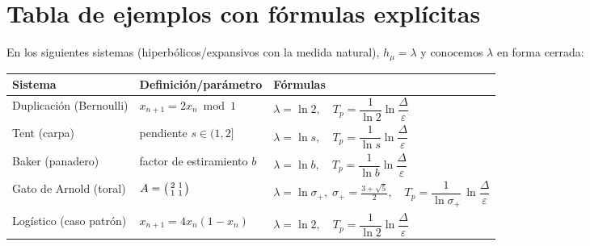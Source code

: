 \documentclass[11pt,a4paper]{article}
\begin{document}
\section*{Tabla de ejemplos con fórmulas explícitas}
En los siguientes sistemas (hiperbólicos/expansivos con la medida natural), $h_\mu=\lambda$ y
conocemos $\lambda$ en forma cerrada:
\begin{center}
\begin{tabular}{@{} l l l @{}}
\toprule
\textbf{Sistema} & \textbf{Definición/parámetro} & \textbf{Fórmulas}\\
\midrule
Duplicación (Bernoulli) & $x_{n+1}=2x_n \bmod 1$ &
$\lambda=\ln 2,\quad T_p=\dfrac{1}{\ln 2}\ln\!\dfrac{\Delta}{\varepsilon}$\\[4pt]
Tent (carpa) & pendiente $s\in(1,2]$ &
$\lambda=\ln s,\quad T_p=\dfrac{1}{\ln s}\ln\!\dfrac{\Delta}{\varepsilon}$\\[4pt]
Baker (panadero) & factor de estiramiento $b$ &
$\lambda=\ln b,\quad T_p=\dfrac{1}{\ln b}\ln\!\dfrac{\Delta}{\varepsilon}$\\[4pt]
Gato de Arnold (toral) & $A=\begin{psmallmatrix}2&1\\[1pt]1&1\end{psmallmatrix}$ &
$\lambda=\ln\sigma_{+},\;\sigma_{+}=\tfrac{3+\sqrt5}{2},\quad
T_p=\dfrac{1}{\ln \sigma_{+}}\,\ln\!\dfrac{\Delta}{\varepsilon}$\\[6pt]
Logístico (caso patrón) & $x_{n+1}=4x_n(1-x_n)$ &
$\lambda=\ln 2,\quad T_p=\dfrac{1}{\ln 2}\ln\!\dfrac{\Delta}{\varepsilon}$\\
\bottomrule
\end{tabular}
\end{center}
\end{document}
